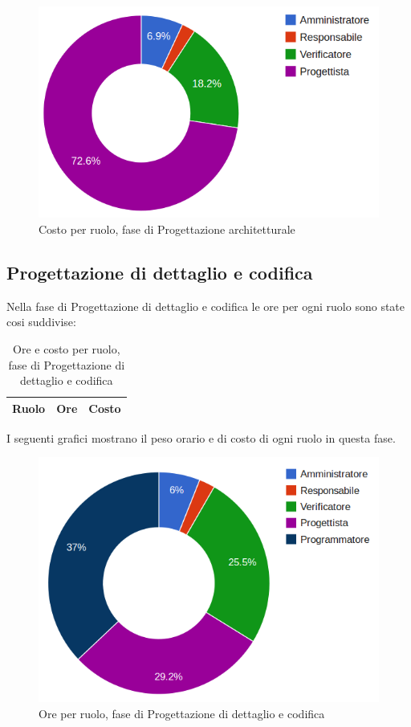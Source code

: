 \begin{figure}[H]
\centering
\includegraphics[scale=0.4]{5-2-2.png}
\caption{Costo per ruolo, fase di Progettazione architetturale\label{fig:nome}}
\end{figure}

\subsection{Progettazione di dettaglio e codifica}

Nella fase di Progettazione di dettaglio e codifica le ore per ogni ruolo sono state cosi suddivise:

\begin{table}[H]
	\centering
	\begin{tabular}{ l c c }
	\textbf{Ruolo} & \textbf{Ore} & \textbf{Costo} \\
	\hline
	
		
	
	\end{tabular}
	\caption{Ore e costo per ruolo, fase di Progettazione di dettaglio e codifica}
	\end{table}

I seguenti grafici mostrano il peso orario e di costo di ogni ruolo in questa fase.

\begin{figure}[H]
\centering
\includegraphics[scale=0.35]{5-3-1.png}
\caption{Ore per ruolo, fase di Progettazione di dettaglio e codifica\label{fig:nome}}
\end{figure}

